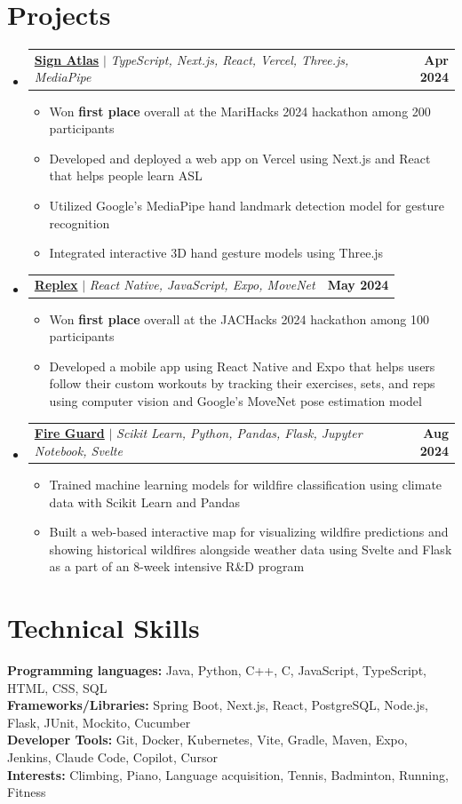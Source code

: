 \documentclass[letterpaper,11pt]{article}
\makeatletter
\newcommand{\resumeItem}[1]{
  \item\small{
    {#1 \vspace{-2pt}}
  }
}
\newcommand{\resumeProjectHeading}[4]{
  \item
  \begin{tabular*}{\textwidth}{l@{\extracolsep{\fill}}r}
    \small{\href{#3}{\textbf{#1}\hspace{0.3em}{\faLink}} $|$ \emph{#2}} & \textbf{\small #4} \\
  \end{tabular*}\vspace{-7pt}
}
\newcommand{\resumeSubHeadingListStart}{\begin{itemize}[leftmargin=0in, label={}]}
\newcommand{\resumeSubHeadingListEnd}{\end{itemize}}
\newcommand{\resumeItemListStart}{\begin{itemize}}
\newcommand{\resumeItemListEnd}{\end{itemize}\vspace{-5pt}}
\makeatother
\begin{document}
\section{Projects}
    \resumeSubHeadingListStart
      \resumeProjectHeading
          {Sign Atlas}
          {TypeScript, Next.js, React, Vercel, Three.js, MediaPipe}
          {https://devpost.com/software/sign-atlas}
          {Apr 2024}
          \resumeItemListStart
            \resumeItem{Won \textbf{first place} overall at the MariHacks 2024 hackathon among 200 participants}
            \resumeItem{Developed and deployed a web app on Vercel using Next.js and React that helps people learn ASL}
            \resumeItem{Utilized Google’s MediaPipe hand landmark detection model for gesture recognition}
            \resumeItem{Integrated interactive 3D hand gesture models using Three.js}
          \resumeItemListEnd
      \resumeProjectHeading
          {Replex}
          {React Native, JavaScript, Expo, MoveNet}
          {https://devpost.com/software/replex}
          {May 2024}
          \resumeItemListStart
            \resumeItem{Won \textbf{first place} overall at the JACHacks 2024 hackathon among 100 participants}
            \resumeItem{Developed a mobile app using React Native and Expo that helps users follow their custom workouts by tracking their exercises, sets, and reps using computer vision and Google’s MoveNet pose estimation model}
          \resumeItemListEnd
      \resumeProjectHeading
          {Fire Guard}
          {Scikit Learn, Python, Pandas, Flask, Jupyter Notebook, Svelte}
          {https://github.com/tran-ethan/fire-guard}
          {Aug 2024}
          \resumeItemListStart
            \resumeItem{Trained machine learning models for wildfire classification using climate data with Scikit Learn and Pandas}
            \resumeItem{Built a web-based interactive map for visualizing wildfire predictions and showing historical wildfires alongside weather data using Svelte and Flask as a part of an 8-week intensive R\&D program}
          \resumeItemListEnd
    \resumeSubHeadingListEnd

%
\section{Technical Skills}
 \begin{itemize}[leftmargin=0in, label={}]
    \small{\item{
     \textbf{Programming languages:}{ Java, Python, C++, C, JavaScript, TypeScript, HTML, CSS, SQL} \\
     \textbf{Frameworks/Libraries:}{ Spring Boot, Next.js, React, PostgreSQL, Node.js, Flask, JUnit, Mockito, Cucumber} \\
     \textbf{Developer Tools:}{ Git, Docker, Kubernetes, Vite, Gradle, Maven, Expo, Jenkins, Claude Code, Copilot, Cursor} \\
     \textbf{Interests:}{ Climbing, Piano, Language acquisition, Tennis, Badminton, Running, Fitness } \\
    }}
 \end{itemize}

\end{document}
